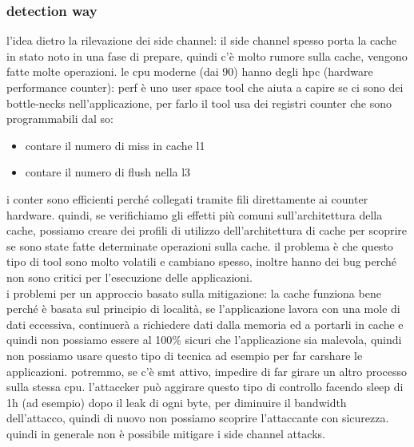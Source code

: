 \documentclass[12pt, oneside]{extbook} %
\begin{document}
\subsubsection{detection way}
l'idea dietro la rilevazione dei side channel: il side channel spesso porta la cache in stato noto in una fase di prepare, quindi c'è molto rumore sulla cache, vengono fatte molte operazioni. le cpu moderne (dai 90) hanno degli hpc (hardware performance counter): perf è uno user space tool che aiuta a capire se ci sono dei bottle-necks nell'applicazione, per farlo il tool usa dei registri counter che sono programmabili dal so:
\begin{itemize}
\item contare il numero di miss in cache l1
\item contare il numero di flush nella l3
\end{itemize}
i conter sono efficienti perché collegati tramite fili direttamente ai counter hardware. quindi, se verifichiamo gli effetti più comuni sull'architettura della cache, possiamo creare dei profili di utilizzo dell'architettura di cache per scoprire se sono state fatte determinate operazioni sulla cache. il problema è che questo tipo di tool sono molto volatili e cambiano spesso, inoltre hanno dei bug perché non sono critici per l'esecuzione delle applicazioni.\\ i problemi per un approccio basato sulla mitigazione: la cache funziona bene perché è basata sul principio di località, se l'applicazione lavora con una mole di dati eccessiva, continuerà a richiedere dati dalla memoria ed a portarli in cache e quindi non possiamo essere al 100\% sicuri che l'applicazione sia malevola, quindi non possiamo usare questo tipo di tecnica ad esempio per far carshare le applicazioni. potremmo, se c'è smt attivo, impedire di far girare un altro processo sulla stessa cpu. l'attaccker può aggirare questo tipo di controllo facendo sleep di 1h (ad esempio) dopo il leak di ogni byte, per diminuire il bandwidth dell'attacco, quindi di nuovo non possiamo scoprire l'attaccante con sicurezza.\\ quindi in generale non è possibile mitigare i side channel attacks.
\end{document}
